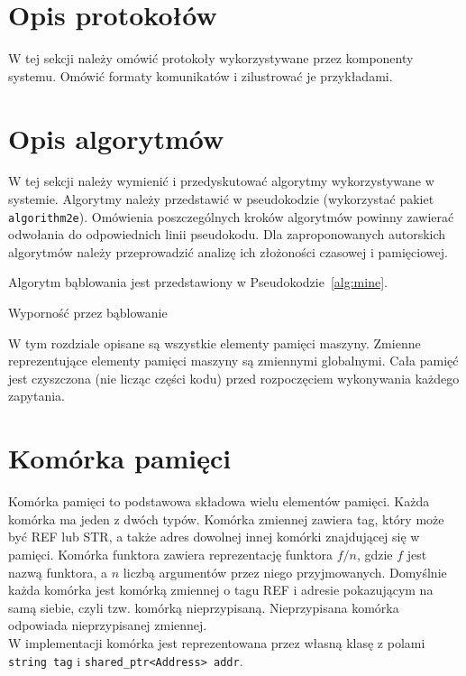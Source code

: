 \section{Opis protokołów}

W tej sekcji należy omówić protokoły wykorzystywane przez komponenty systemu. Omówić formaty komunikatów i zilustrować je przykładami. 

\section{Opis algorytmów}

W tej sekcji należy wymienić i przedyskutować algorytmy wykorzystywane w systemie. Algorytmy należy przedstawić w pseudokodzie (wykorzystać pakiet \texttt{algorithm2e}). Omówienia poszczególnych kroków algorytmów powinny zawierać odwołania do odpowiednich linii pseudokodu. Dla zaproponowanych autorskich algorytmów należy przeprowadzić analizę ich złożoności czasowej i pamięciowej. 

{\color{dgray}
Algorytm bąblowania jest przedstawiony w Pseudokodzie~\ref{alg:mine}.
}

{\small
\begin{pseudokod}[H]
\caption{Wyporność przez bąblowanie}\label{alg:mine}
\end{pseudokod}
}
\fi

W tym rozdziale opisane są wszystkie elementy pamięci maszyny. Zmienne reprezentujące elementy pamięci maszyny są zmiennymi globalnymi. Cała pamięć jest czyszczona (nie licząc części kodu) przed rozpoczęciem wykonywania każdego zapytania.

\section{Komórka pamięci}

Komórka pamięci to podstawowa składowa wielu elementów pamięci. Każda komórka ma jeden z dwóch typów. Komórka zmiennej zawiera tag, który może być {REF} lub {STR}, a także adres dowolnej innej komórki znajdującej się w pamięci. Komórka funktora zawiera reprezentację funktora $f/n$, gdzie $f$ jest nazwą funktora, a $n$ liczbą argumentów przez niego przyjmowanych. Domyślnie każda komórka jest komórką zmiennej o tagu {REF} i adresie pokazującym na samą siebie, czyli tzw. komórką nieprzypisaną. Nieprzypisana komórka odpowiada nieprzypisanej zmiennej.\\
W implementacji komórka jest reprezentowana przez własną klasę z polami \texttt{string tag} i \texttt{shared\_ptr<Address> addr}.


